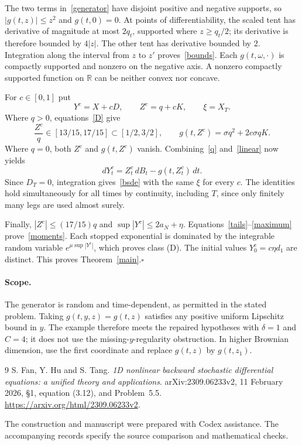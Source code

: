\documentclass[11pt]{article}
\begin{document}
The two terms in~\eqref{generator} have disjoint positive and negative supports, so $|g(t,z)|\leq z^2$ and $g(t,0)=0$. At points of differentiability, the scaled tent has derivative of magnitude at most $2q_t$, supported where $z\geq q_t/2$; its derivative is therefore bounded by $4|z|$. The other tent has derivative bounded by $2$. Integration along the interval from $z$ to $z'$ proves~\eqref{bounds}. Each $g(t,\omega,\cdot)$ is compactly supported and nonzero on the negative axis. A nonzero compactly supported function on $\mathbb R$ can be neither convex nor concave.

For $c\in[0,1]$ put
\[
 Y^c=X+cD,\qquad Z^c=q+cK,\qquad \xi=X_T.
\]
Where $q>0$, equations~\eqref{D} give
\[
 \frac{Z^c}{q}\in[13/15,17/15]\subset[1/2,3/2],
 \qquad
 g(t,Z^c)=\sigma q^2+2c\sigma qK.
\]
Where $q=0$, both $Z^c$ and $g(t,Z^c)$ vanish. Combining~\eqref{q} and~\eqref{linear} now yields
\[
 dY^c_t=Z^c_t\,dB_t-g(t,Z^c_t)\,dt.
\]
Since $D_T=0$, integration gives~\eqref{bsde} with the same $\xi$ for every $c$. The identities hold simultaneously for all times by continuity, including $T$, since only finitely many legs are used almost surely.

Finally, $|Z^c|\leq(17/15)q$ and $\sup|Y^c|\leq2a_N+\eta$. Equations~\eqref{tails}--\eqref{maximum} prove~\eqref{moments}. Each stopped exponential is dominated by the integrable random variable $e^{\mu\sup|Y^c|}$, which proves class (D). The initial values $Y^c_0=c\eta d_1$ are distinct. This proves Theorem~\ref{main}.\hfill$\square$

\paragraph{Scope.}
The generator is random and time-dependent, as permitted in the stated problem. Taking $g(t,y,z)=g(t,z)$ satisfies any positive uniform Lipschitz bound in $y$. The example therefore meets the repaired hypotheses with $\delta=1$ and $C=4$; it does not use the missing-$y$-regularity obstruction. In higher Brownian dimension, use the first coordinate and replace $g(t,z)$ by $g(t,z_1)$.

\begin{thebibliography}{9}
 S. Fan, Y. Hu and S. Tang.
\emph{1D nonlinear backward stochastic differential equations: a unified theory and applications}.
arXiv:2309.06233v2, 11 February 2026, \S1, equation (3.12), and Problem~5.5.
\url{https://arxiv.org/html/2309.06233v2}.
\end{thebibliography}
\smallskip\noindent\footnotesize
The construction and manuscript were prepared with Codex assistance. The accompanying records specify the source comparison and mathematical checks.
\end{document}
